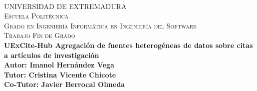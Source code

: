\begin{titlepage}
  \begin{adjustwidth}{-1.5cm}{0cm}

    \vspace{-3.5em}
    \hspace{-0.5em}
    \begin{minipage}{0.45\textwidth}
      \begin{flushleft}
        
      \end{flushleft}
    \end{minipage}

    \vspace{-6em}
    \hspace{20em}
    \begin{minipage}{0.45\textwidth}
      \begin{flushright}
        
      \end{flushright}
    \end{minipage}\\[1.5cm]

    \begin{center}
      \textsc{\LARGE UNIVERSIDAD DE EXTREMADURA}\\[3cm]

      \textsc{\Large Escuela Politécnica}\\[0.5cm]
      \textsc{\Large Grado en Ingeniería Informática en Ingeniería del Software}\\[2.5cm]
      \textsc{\Large Trabajo Fin de Grado}\\[0.5cm]
      {\large \bfseries UExCite-Hub Agregación de fuentes heterogéneas de datos sobre citas a artículos de investigación}\\[4.0cm]
      {\large \bfseries Autor: Imanol Hernández Vega}\\[0.5cm]
      {\large \bfseries Tutor: Cristina Vicente Chicote}\\[0.5cm]
      {\large \bfseries Co-Tutor: Javier Berrocal Olmeda}\\[0.5cm]
      \vfill

      {\large}
    \end{center}
  \end{adjustwidth}
\end{titlepage}
